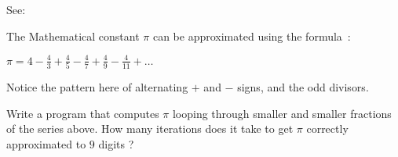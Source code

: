 
See:\\

The Mathematical constant $\pi$ can be approximated using the formula~:\\

\begin{center}
{\large
\begin{math}
	\pi = 4 - \frac{4}{3} + \frac{4}{5} - \frac{4}{7} + \frac{4}{9} - \frac{4}{11} + \ldots
\end{math}
}
\end{center}

Notice the pattern here of alternating $+$ and $-$ signs, and the odd divisors.

\begin{exercise}
Write a program that computes $\pi$ looping through smaller and smaller
fractions of the series above. How many iterations does it take to get $\pi$
correctly approximated to $9$ digits ?
\end{exercise}
